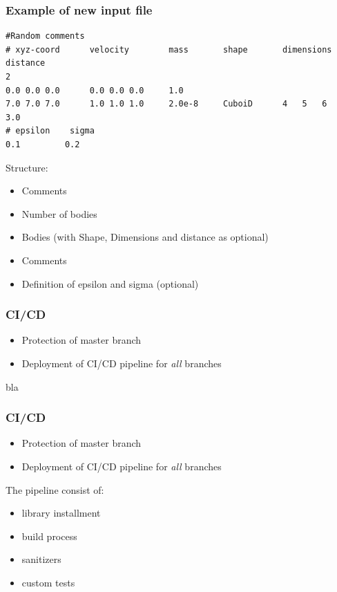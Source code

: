 

\begin{frame}[fragile]
\frametitle{Example of new input file}

 \begin{Verbatim}
#Random comments
# xyz-coord      velocity        mass       shape       dimensions      distance  
2
0.0 0.0 0.0      0.0 0.0 0.0     1.0
7.0 7.0 7.0      1.0 1.0 1.0     2.0e-8     CuboiD      4	5	6         3.0
# epsilon    sigma
0.1         0.2
 \end{Verbatim}

\vspace{-0.5cm}
\large
Structure:
\vspace{-0.7cm}
\begin{itemize}
	\item<1-> Comments
	\item<1-> Number of bodies
	\item<2-> Bodies (with Shape, Dimensions and distance as optional)
	\item<3-> Comments
	\item<4- > Definition of epsilon and sigma (optional)
\end{itemize}

\end{frame}

\begin{frame}
	\frametitle{CI/CD}
	\large
	\begin{itemize}
		\item<1-> Protection of master branch
		\item<2-> Deployment of CI/CD pipeline for \textit{all} branches 
	\end{itemize}
	bla
\end{frame}

\begin{frame}
	\frametitle{CI/CD}
	\large
	\begin{itemize}
		\item Protection of master branch
		\item Deployment of CI/CD pipeline for \textit{all} branches 
	\end{itemize}
	\Large
	The pipeline consist of:
	\large
	\begin{itemize}
		\item<1-> library installment
		\item<2-> build process
		\item<3-> sanitizers
		\item<4-> custom tests
	\end{itemize}
\end{frame}

